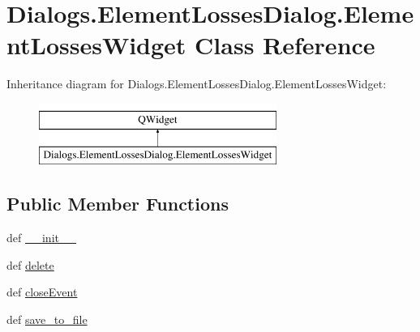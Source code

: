 \hypertarget{classDialogs_1_1ElementLossesDialog_1_1ElementLossesWidget}{\section{Dialogs.\-Element\-Losses\-Dialog.\-Element\-Losses\-Widget Class Reference}
\label{classDialogs_1_1ElementLossesDialog_1_1ElementLossesWidget}
}
Inheritance diagram for Dialogs.\-Element\-Losses\-Dialog.\-Element\-Losses\-Widget\-:\begin{figure}[H]
\begin{center}
\leavevmode
\includegraphics[height=2.000000cm]{classDialogs_1_1ElementLossesDialog_1_1ElementLossesWidget}
\end{center}
\end{figure}
\subsection*{Public Member Functions}
\begin{DoxyCompactItemize}
\item 
def \hyperlink{classDialogs_1_1ElementLossesDialog_1_1ElementLossesWidget_aa500c40b6c7b1d00780020c25489e0b2}{\-\_\-\-\_\-init\-\_\-\-\_\-}
\item 
def \hyperlink{classDialogs_1_1ElementLossesDialog_1_1ElementLossesWidget_a22fbeb57e6d1a772d76b273e5bcfa9a3}{delete}
\item 
def \hyperlink{classDialogs_1_1ElementLossesDialog_1_1ElementLossesWidget_af1506f3e49151f8ef37a536cee67a949}{close\-Event}
\item 
def \hyperlink{classDialogs_1_1ElementLossesDialog_1_1ElementLossesWidget_ac5f515fde2d5241d46c75f58dc32d103}{save\-\_\-to\-\_\-file}
\end{DoxyCompactItemize}
